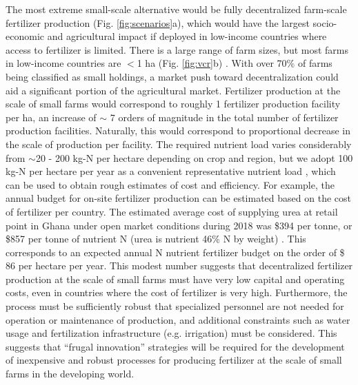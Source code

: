 The most extreme small-scale alternative would be fully decentralized farm-scale fertilizer production (Fig. \ref{fig:scenarios}a), which would have the largest socio-economic and agricultural impact if deployed in low-income countries where access to fertilizer is limited. There is a large range of farm sizes, but most farms in low-income countries are $<$1 ha (Fig. \ref{fig:vcr}b)\cite{Lowder_2016} . With over 70\% of farms being classified as small holdings, a market push toward decentralization could aid a significant portion of the agricultural market. Fertilizer production at the scale of small farms would  correspond to roughly 1 fertilizer production facility per ha, an increase of $\sim$ 7 orders of magnitude in the total number of fertilizer production facilities. Naturally, this would correspond to proportional decrease in the scale of production per facility.
The required nutrient load varies considerably from $\sim$20 - 200 kg-N per hectare depending on crop and region, but we adopt 100 kg-N per hectare per year as a convenient representative nutrient load \cite{FAOSTAT}, which can be used to obtain rough estimates of cost and efficiency. For example, the annual budget for on-site fertilizer production can be estimated based on the cost of fertilizer per country. The estimated average cost of supplying urea at retail point in Ghana under open market conditions during 2018 was \$394 per tonne, or \$857 per tonne of nutrient N (urea is nutrient 46\% N by weight) \cite{africa_fert_2017}.
 This corresponds to an expected annual N nutrient fertilizer budget on the order of \$ 86 per hectare per year. This modest number suggests that decentralized fertilizer production at the scale of small farms must have very low capital and operating costs, even in countries where the cost of fertilizer is very high. Furthermore, the process must be sufficiently robust that specialized personnel are not needed for operation or maintenance of production, and additional constraints such as water usage and fertilization infrastructure (e.g. irrigation) must be considered. 
 This suggests that ``frugal innovation'' strategies \cite{Weyrauch_2016} will be required for the development of inexpensive and robust processes for producing fertilizer at the scale of small farms in the developing world. 
 
